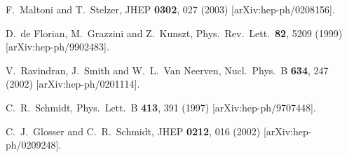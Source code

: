 \documentclass[12pt]{article}
\begin{document}
\begin{thebibliography}{99}
%
F.~Maltoni and T.~Stelzer,
JHEP {\bf 0302}, 027 (2003)
[arXiv:hep-ph/0208156].

D.~de Florian, M.~Grazzini and Z.~Kunszt,
Phys.\ Rev.\ Lett.\  {\bf 82}, 5209 (1999)
[arXiv:hep-ph/9902483].

V.~Ravindran, J.~Smith and W.~L.~Van Neerven,
Nucl.\ Phys.\ B {\bf 634}, 247 (2002)
[arXiv:hep-ph/0201114].

C.~R.~Schmidt,
Phys.\ Lett.\ B {\bf 413}, 391 (1997)
[arXiv:hep-ph/9707448].

C.~J.~Glosser and C.~R.~Schmidt,
JHEP {\bf 0212}, 016 (2002)
[arXiv:hep-ph/0209248].

\end{thebibliography}
\end{document}
